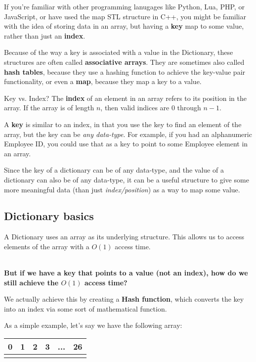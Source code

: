 \documentclass[a4paper,12pt,oneside]{book}
\begin{document}
If you're familiar with other programming lanugages like Python,
Lua, PHP, or JavaScript, or have used the map STL structure in C++,
you might be familiar with the idea of storing data in an array,
but having a \textbf{key} map to some value, rather than just
an \textbf{index}.

Because of the way a key is associated with a value in the Dictionary,
these structures are often called \textbf{associative arrays}. They
are sometimes also called \textbf{hash tables}, because they use a
hashing function to achieve the key-value pair functionality,
or even a \textbf{map}, because they map a key to a value.

\begin{hint}{Key vs. Index?}
    The \textbf{index} of an element in an array refers to its position
    in the array. If the array is of length $n$, then valid indices
    are $0$ through $n-1$.

    A \textbf{key} is similar to an index, in that you use the key to
    find an element of the array, but the key can be \textit{any data-type}.
    For example, if you had an alphanumeric Employee ID, you could use
    that as a key to point to some Employee element in an array.
\end{hint}

Since the key of a dictionary can be of any data-type, and the value
of a dictionary can also be of any data-type, it can be a useful
structure to give some more meaningful data (than just \textit{index/position})
as a way to map some value.

\subsection{Dictionary basics}

A Dictionary uses an array as its underlying structure. This allows us
to access elements of the array with a $O(1)$ access time.

~\\
\textbf{But if we have a key that points to a value (not an index), how do we still
achieve the $O(1)$ access time?}

We actually achieve this by creating a \textbf{Hash function}, which
converts the key into an index via some sort of mathematical function.

As a simple example, let's say we have the following array:

\begin{center}
    \begin{tabular}{| c | c | c | c | c | c |}
        \hline
        0 & 1 & 2 & 3 & ... & 26
        \\ \hline
        & & & & &
        \\ \hline
    \end{tabular}
\end{center}
\end{document}
